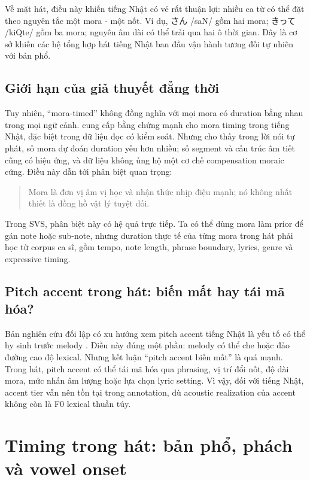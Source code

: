 \documentclass[12pt,a4paper]{article}
\newcommand{\jp}[1]{{\CJKfontspec{Noto Serif CJK JP}#1}}
\begin{document}
Về mặt hát, điều này khiến tiếng Nhật có vẻ rất thuận lợi: nhiều ca từ có thể đặt theo nguyên tắc một mora - một nốt. Ví dụ, 
\jp{さん} /saN/ gồm hai mora; 
\jp{きって} /kiQte/ gồm ba mora; nguyên âm dài có thể trải qua hai ô thời gian. Đây là cơ sở khiến các hệ tổng hợp hát tiếng Nhật ban đầu vận hành tương đối tự nhiên với bản phổ.

\subsection{Giới hạn của giả thuyết đẳng thời}

Tuy nhiên, 
\enquote{mora-timed} không đồng nghĩa với mọi mora có duration bằng nhau trong mọi ngữ cảnh. \textcite{port1987mora} cung cấp bằng chứng mạnh cho mora timing trong tiếng Nhật, đặc biệt trong dữ liệu đọc có kiểm soát. Nhưng \textcite{warner2001mora} cho thấy trong lời nói tự phát, số mora dự đoán duration yếu hơn nhiều; số segment và cấu trúc âm tiết cũng có hiệu ứng, và dữ liệu không ủng hộ một cơ chế compensation moraic cứng. Điều này dẫn tới phân biệt quan trọng:

\begin{quote}
Mora là đơn vị âm vị học và nhận thức nhịp điệu mạnh; nó không nhất thiết là đồng hồ vật lý tuyệt đối.
\end{quote}

Trong SVS, phân biệt này có hệ quả trực tiếp. Ta có thể dùng mora làm prior để gán note hoặc sub-note, nhưng duration thực tế của từng mora trong hát phải học từ corpus ca sĩ, gồm tempo, note length, phrase boundary, lyrics, genre và expressive timing.

\subsection{Pitch accent trong hát: biến mất hay tái mã hóa?}

Bản nghiên cứu đối lập có xu hướng xem pitch accent tiếng Nhật là yếu tố có thể hy sinh trước melody \parencite{opposingResearch2026}. Điều này đúng một phần: melody có thể che hoặc đảo đường cao độ lexical. Nhưng kết luận 
\enquote{pitch accent biến mất} là quá mạnh. Trong hát, pitch accent có thể tái mã hóa qua phrasing, vị trí đổi nốt, độ dài mora, mức nhấn âm lượng hoặc lựa chọn lyric setting. Vì vậy, đối với tiếng Nhật, accent tier vẫn nên tồn tại trong annotation, dù acoustic realization của accent không còn là F0 lexical thuần túy.

\section{Timing trong hát: bản phổ, phách và vowel onset}
\end{document}
